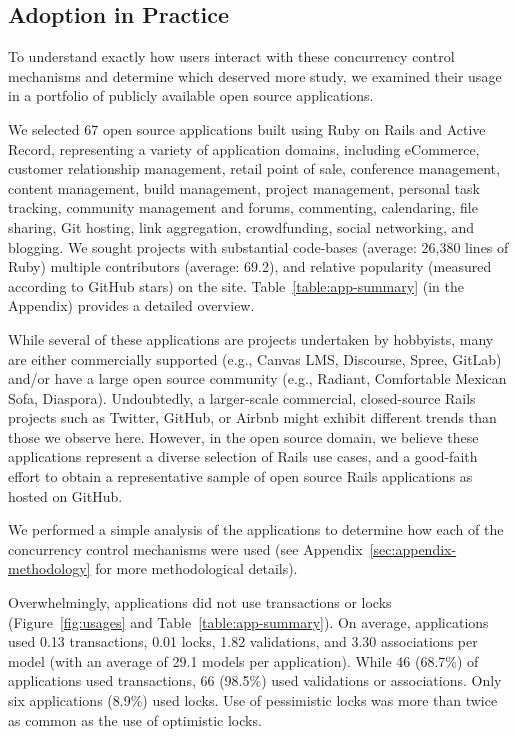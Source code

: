 \subsection{Adoption in Practice}

To understand exactly how users interact with these
concurrency control mechanisms and determine which deserved more
study, we examined their usage in a portfolio of publicly available
open source applications.

 We selected 67 open source applications
built using Ruby on Rails and Active Record, representing a variety of
application domains, including eCommerce, customer relationship
management, retail point of sale, conference management, content
management, build management, project management, personal task
tracking, community management and forums, commenting, calendaring,
file sharing, Git hosting, link aggregation, crowdfunding, social
networking, and blogging. We sought projects with substantial
code-bases (average: 26,380 lines of Ruby) multiple contributors
(average: 69.2), and relative popularity (measured according to GitHub
stars) on the site. Table~\ref{table:app-summary} (in the Appendix)
provides a detailed overview.


While several of these applications are projects undertaken by
hobbyists, many are either commercially supported (e.g., Canvas LMS,
Discourse, Spree, GitLab) and/or have a large open source community
(e.g., Radiant, Comfortable Mexican Sofa, Diaspora). Undoubtedly, a
larger-scale commercial, closed-source Rails projects such as Twitter,
GitHub, or Airbnb might exhibit different trends than those we observe
here. However, in the open source domain, we believe these
applications represent a diverse selection of Rails use cases, and a
good-faith effort to obtain a representative sample of open source
Rails applications as hosted on GitHub.

 We performed a simple analysis of the
applications to determine how each of the concurrency control
mechanisms were used (see Appendix~\ref{sec:appendix-methodology} for more
methodological details).

Overwhelmingly, applications did not use transactions or locks
(Figure~\ref{fig:usages} and Table~\ref{table:app-summary}). On
average, applications used 0.13 transactions, 0.01 locks, 1.82
validations, and 3.30 associations per model (with an average of 29.1
models per application). While 46 (68.7\%) of applications used
transactions, 66 (98.5\%) used validations or associations. Only six
applications (8.9\%) used locks. Use of pessimistic locks was more than
twice as common as the use of optimistic locks.

